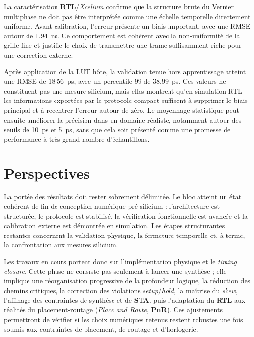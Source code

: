 La caractérisation \textbf{RTL}/\textit{Xcelium} confirme que la structure brute du Vernier multiphase ne doit pas être interprétée comme une échelle temporelle directement uniforme. Avant calibration, l'erreur présente un biais important, avec une RMSE autour de \SI{1.94}{\nano\second}. Ce comportement est cohérent avec la non-uniformité de la grille fine et justifie le choix de transmettre une trame suffisamment riche pour une correction externe.

Après application de la LUT hôte, la validation tenue hors apprentissage atteint une RMSE de \SI{18.56}{\pico\second}, avec un percentile 99 de \SI{38.99}{\pico\second}. Ces valeurs ne constituent pas une mesure silicium, mais elles montrent qu'en simulation RTL les informations exportées par le protocole compact suffisent à supprimer le biais principal et à recentrer l'erreur autour de zéro. Le moyennage statistique peut ensuite améliorer la précision dans un domaine réaliste, notamment autour des seuils de \SI{10}{\pico\second} et \SI{5}{\pico\second}, sans que cela soit présenté comme une promesse de performance à très grand nombre d'échantillons.

\section{Perspectives}

La portée des résultats doit rester sobrement délimitée. Le bloc atteint un état cohérent de fin de conception numérique pré-silicium : l'architecture est structurée, le protocole est stabilisé, la vérification fonctionnelle est avancée et la calibration externe est démontrée en simulation. Les étapes structurantes restantes concernent la validation physique, la fermeture temporelle et, à terme, la confrontation aux mesures silicium.

Les travaux en cours portent donc sur l'implémentation physique et le \textit{timing closure}. Cette phase ne consiste pas seulement à lancer une synthèse ; elle implique une réorganisation progressive de la profondeur logique, la réduction des chemins critiques, la correction des violations \textit{setup}/\textit{hold}, la maîtrise du \textit{skew}, l'affinage des contraintes de synthèse et de \textbf{STA}, puis l'adaptation du \textbf{RTL} aux réalités du placement-routage (\textit{Place and Route}, \textbf{PnR}). Ces ajustements permettront de vérifier si les choix numériques retenus restent robustes une fois soumis aux contraintes de placement, de routage et d'horlogerie.

